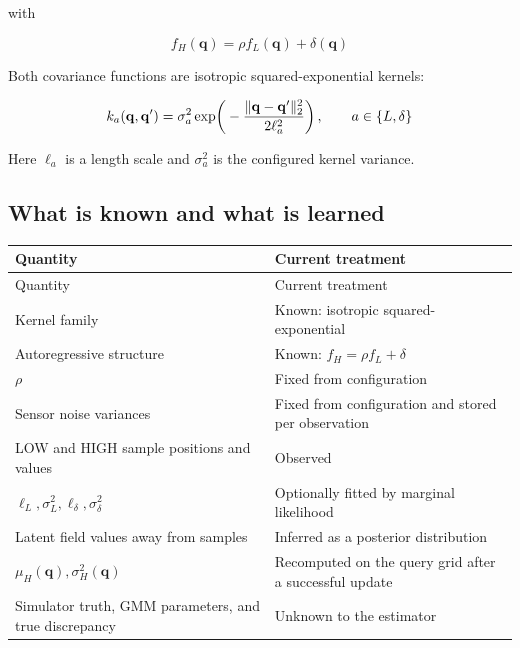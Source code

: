 \documentclass[11pt]{article}
\begin{document}
with


\begin{equation}
f_H(\mathbf q)=\rho f_L(\mathbf q)+\delta(\mathbf q)
\end{equation}


Both covariance functions are isotropic squared-exponential kernels:


\begin{equation}
k_a(\mathbf q,\mathbf q') \\
= \\
\sigma_a^2 \\
\exp\!\left( \\
-\frac{\lVert\mathbf q-\mathbf q'\rVert_2^2}{2\ell_a^2} \\
\right), \qquad
a\in\{L,\delta\}
\end{equation}


Here $\ell_a$ is a length scale and $\sigma_a^2$ is the configured kernel variance.


\subsection{What is known and what is learned}


\begin{longtable}{p{} p{}}
\toprule
Quantity & Current treatment \\
\midrule
\endfirsthead
\toprule
Quantity & Current treatment \\
\midrule
\endhead
Kernel family & Known: isotropic squared-exponential \\
Autoregressive structure & Known: $f_H=\rho f_L+\delta$ \\
$\rho$ & Fixed from configuration \\
Sensor noise variances & Fixed from configuration and stored per observation \\
LOW and HIGH sample positions and values & Observed \\
$\ell_L,\sigma_L^2,\ell_\delta,\sigma_\delta^2$ & Optionally fitted by marginal likelihood \\
Latent field values away from samples & Inferred as a posterior distribution \\
$\mu_H(\mathbf q),\sigma_H^2(\mathbf q)$ & Recomputed on the query grid after a successful update \\
Simulator truth, GMM parameters, and true discrepancy & Unknown to the estimator \\
\bottomrule
\end{longtable}
\end{document}
